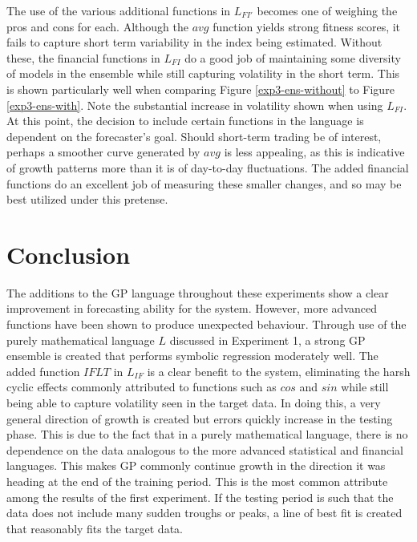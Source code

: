 \documentclass[12pt, letterpaper]{article}
\begin{document}
\textrm{ \indent The use of the various additional functions in $L_{FI'}$ becomes one of weighing the pros and cons for each. Although the $avg$ function yields strong fitness scores, it fails to capture short term variability in the index being estimated. Without these, the financial functions in $L_{FI}$ do a good job of maintaining some diversity of models in the ensemble while still capturing volatility in the short term. This is shown particularly well when comparing Figure \ref{exp3-ens-without} to Figure \ref{exp3-ens-with}. Note the substantial increase in volatility shown when using $L_{FI}$. At this point, the decision to include certain functions in the language is dependent on the forecaster's goal. Should short-term trading be of interest, perhaps a smoother curve generated by $avg$ is less appealing, as this is indicative of growth patterns more than it is of day-to-day fluctuations. The added financial functions do an excellent job of measuring these smaller changes, and so may be best utilized under this pretense. }

\newpage 

\section{Conclusion}

\textrm{ \indent The additions to the GP language throughout these experiments show a clear improvement in forecasting ability for the system. However, more advanced functions have been shown to produce unexpected behaviour. Through use of the purely mathematical language $L$ discussed in Experiment 1, a strong GP ensemble is created that performs symbolic regression moderately well. The added function $IFLT$ in $L_{IF}$ is a clear benefit to the system, eliminating the harsh cyclic effects commonly attributed to functions such as $cos$ and $sin$ while still being able to capture volatility seen in the target data. In doing this, a very general direction of growth is created but errors quickly increase in the testing phase. This is due to the fact that in a purely mathematical language, there is no dependence on the data analogous to the more advanced statistical and financial languages. This makes GP commonly continue growth in the direction it was heading at the end of the training period. This is the most common attribute among the results of the first experiment. If the testing period is such that the data does not include many sudden troughs or peaks, a line of best fit is created that reasonably fits the target data. }
\end{document}
